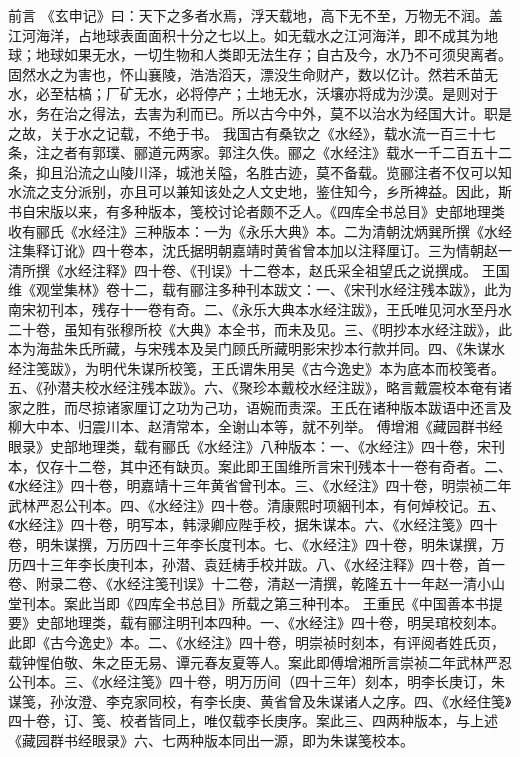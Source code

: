\documentclass[12pt,UTF8]{ctexbook}
\begin{document}
前言
《玄申记》曰：天下之多者水焉，浮天载地，高下无不至，万物无不润。盖江河海洋，占地球表面面积十分之七以上。如无载水之江河海洋，即不成其为地球；地球如果无水，一切生物和人类即无法生存；自古及今，水乃不可须臾离者。固然水之为害也，怀山襄陵，浩浩滔天，漂没生命财产，数以亿计。然若禾苗无水，必至枯槁；厂矿无水，必将停产；土地无水，沃壤亦将成为沙漠。是则对于水，务在治之得法，去害为利而已。所以古今中外，莫不以治水为经国大计。职是之故，关于水之记载，不绝于书。
我国古有桑钦之《水经》，载水流一百三十七条，注之者有郭璞、郦道元两家。郭注久佚。郦之《水经注》载水一千二百五十二条，抑且沿流之山陵川泽，城池关隘，名胜古迹，莫不备载。览郦注者不仅可以知水流之支分派别，亦且可以兼知该处之人文史地，鉴住知今，乡所裨益。因此，斯书自宋版以来，有多种版本，笺校讨论者颇不乏人。《四库全书总目》史部地理类收有郦氏《水经注》三种版本：一为《永乐大典》本。二为清朝沈炳巽所撰《水经注集释订讹》四十卷本，沈氏据明朝嘉靖时黄省曾本加以注释厘订。三为情朝赵一清所撰《水经注释》四十卷、《刊误》十二卷本，赵氏采全祖望氏之说撰成。
王国维《观堂集林》卷十二，载有郦注多种刊本跋文：一、《宋刊水经注残本跋》，此为南宋初刊本，残存十一卷有奇。二、《永乐大典本水经注跋》，王氏唯见河水至丹水二十卷，虽知有张穆所校《大典》本全书，而未及见。三、《明抄本水经注跋》，此本为海盐朱氏所藏，与宋残本及吴门顾氏所藏明影宋抄本行款并同。四、《朱谋水经注笺跋》，为明代朱谋所校笺，王氏谓朱用吴《古今逸史》本为底本而校笺者。五、《孙潜夫校水经注残本跋》。六、《聚珍本戴校水经注跋》，略言戴震校本奄有诸家之胜，而尽掠诸家厘订之功为己功，语婉而责深。王氏在诸种版本跋语中还言及柳大中本、归震川本、赵清常本，全谢山本等，就不列举。
傅增湘《藏园群书经眼录》史部地理类，载有郦氏《水经注》八种版本：一、《水经注》四十卷，宋刊本，仅存十二卷，其中还有缺页。案此即王国维所言宋刊残本十一卷有奇者。二、《水经注》四十卷，明嘉靖十三年黄省曾刊本。三、《水经注》四十卷，明崇祯二年武林严忍公刊本。四、《水经注》四十卷。清康熙时项絪刊本，有何焯校记。五、《水经注》四十卷，明写本，韩渌卿应陛手校，据朱谋本。六、《水经注笺》四十卷，明朱谋撰，万历四十三年李长度刊本。七、《水经注》四十卷，明朱谋撰，万历四十三年李长庚刊本，孙潜、袁廷梼手校并跋。八、《水经注释》四十卷，首一卷、附录二卷、《水经注笺刊误》十二卷，清赵一清撰，乾隆五十一年赵一清小山堂刊本。案此当即《四库全书总目》所载之第三种刊本。
王重民《中国善本书提要》史部地理类，载有郦注明刊本四种。一、《水经注》四十卷，明吴琯校刻本。此即《古今逸史》本。二、《水经注》四十卷，明崇祯时刻本，有评阅者姓氏页，载钟惺伯敬、朱之臣无易、谭元春友夏等人。案此即傅增湘所言崇祯二年武林严忍公刊本。三、《水经注笺》四十卷，明万历间（四十三年）刻本，明李长庚订，朱谋笺，孙汝澄、李克家同校，有李长庚、黄省曾及朱谋诸人之序。四、《水经住笺》四十卷，订、笺、校者皆同上，唯仅载李长庚序。案此三、四两种版本，与上述《藏园群书经眼录》六、七两种版本同出一源，即为朱谋笺校本。
\end{document}
